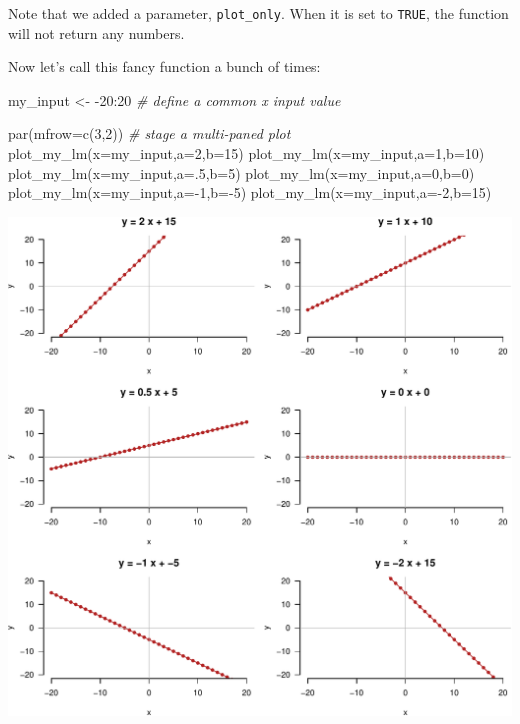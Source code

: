\documentclass[
]{book}
\newenvironment{Shaded}{\begin{snugshade}}{\end{snugshade}}
\newcommand{\AttributeTok}[1]{\textcolor[rgb]{0.77,0.63,0.00}{#1}}
\newcommand{\CommentTok}[1]{\textcolor[rgb]{0.56,0.35,0.01}{\textit{#1}}}
\newcommand{\DecValTok}[1]{\textcolor[rgb]{0.00,0.00,0.81}{#1}}
\newcommand{\FunctionTok}[1]{\textcolor[rgb]{0.00,0.00,0.00}{#1}}
\newcommand{\NormalTok}[1]{#1}
\newcommand{\OtherTok}[1]{\textcolor[rgb]{0.56,0.35,0.01}{#1}}
\newcommand{\SpecialCharTok}[1]{\textcolor[rgb]{0.00,0.00,0.00}{#1}}
\begin{document}
Note that we added a parameter, \texttt{plot\_only}. When it is set to \texttt{TRUE}, the function will not return any numbers.

Now let's call this fancy function a bunch of times:

\begin{Shaded}
\begin{Highlighting}[]
\NormalTok{my\_input }\OtherTok{\textless{}{-}} \SpecialCharTok{{-}}\DecValTok{20}\SpecialCharTok{:}\DecValTok{20} \CommentTok{\# define a common x input value}

\FunctionTok{par}\NormalTok{(}\AttributeTok{mfrow=}\FunctionTok{c}\NormalTok{(}\DecValTok{3}\NormalTok{,}\DecValTok{2}\NormalTok{)) }\CommentTok{\# stage a multi{-}paned plot}
\FunctionTok{plot\_my\_lm}\NormalTok{(}\AttributeTok{x=}\NormalTok{my\_input,}\AttributeTok{a=}\DecValTok{2}\NormalTok{,}\AttributeTok{b=}\DecValTok{15}\NormalTok{)}
\FunctionTok{plot\_my\_lm}\NormalTok{(}\AttributeTok{x=}\NormalTok{my\_input,}\AttributeTok{a=}\DecValTok{1}\NormalTok{,}\AttributeTok{b=}\DecValTok{10}\NormalTok{)}
\FunctionTok{plot\_my\_lm}\NormalTok{(}\AttributeTok{x=}\NormalTok{my\_input,}\AttributeTok{a=}\NormalTok{.}\DecValTok{5}\NormalTok{,}\AttributeTok{b=}\DecValTok{5}\NormalTok{)}
\FunctionTok{plot\_my\_lm}\NormalTok{(}\AttributeTok{x=}\NormalTok{my\_input,}\AttributeTok{a=}\DecValTok{0}\NormalTok{,}\AttributeTok{b=}\DecValTok{0}\NormalTok{)}
\FunctionTok{plot\_my\_lm}\NormalTok{(}\AttributeTok{x=}\NormalTok{my\_input,}\AttributeTok{a=}\SpecialCharTok{{-}}\DecValTok{1}\NormalTok{,}\AttributeTok{b=}\SpecialCharTok{{-}}\DecValTok{5}\NormalTok{)}
\FunctionTok{plot\_my\_lm}\NormalTok{(}\AttributeTok{x=}\NormalTok{my\_input,}\AttributeTok{a=}\SpecialCharTok{{-}}\DecValTok{2}\NormalTok{,}\AttributeTok{b=}\DecValTok{15}\NormalTok{)}
\end{Highlighting}
\end{Shaded}

\includegraphics{figures/unnamed-chunk-298-1.pdf}
\end{document}

